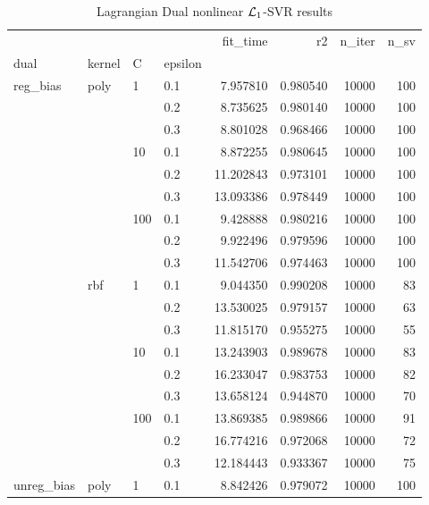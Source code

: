 \begin{table}[H]
\centering
\caption{Lagrangian Dual nonlinear $\protect \mathcal{L}_1$-SVR results}
\label{nonlinear_lagrangian_dual_l1_svr_cv_results}
\begin{tabular}{llllrrrr}
\toprule
           &     &     &     &   fit\_time &        r2 &  n\_iter &  n\_sv \\
dual & kernel & C & epsilon &            &           &         &       \\
\midrule
reg\_bias & poly & 1   & 0.1 &   7.957810 &  0.980540 &   10000 &   100 \\
           &     &     & 0.2 &   8.735625 &  0.980140 &   10000 &   100 \\
           &     &     & 0.3 &   8.801028 &  0.968466 &   10000 &   100 \\
           &     & 10  & 0.1 &   8.872255 &  0.980645 &   10000 &   100 \\
           &     &     & 0.2 &  11.202843 &  0.973101 &   10000 &   100 \\
           &     &     & 0.3 &  13.093386 &  0.978449 &   10000 &   100 \\
           &     & 100 & 0.1 &   9.428888 &  0.980216 &   10000 &   100 \\
           &     &     & 0.2 &   9.922496 &  0.979596 &   10000 &   100 \\
           &     &     & 0.3 &  11.542706 &  0.974463 &   10000 &   100 \\
           & rbf & 1   & 0.1 &   9.044350 &  0.990208 &   10000 &    83 \\
           &     &     & 0.2 &  13.530025 &  0.979157 &   10000 &    63 \\
           &     &     & 0.3 &  11.815170 &  0.955275 &   10000 &    55 \\
           &     & 10  & 0.1 &  13.243903 &  0.989678 &   10000 &    83 \\
           &     &     & 0.2 &  16.233047 &  0.983753 &   10000 &    82 \\
           &     &     & 0.3 &  13.658124 &  0.944870 &   10000 &    70 \\
           &     & 100 & 0.1 &  13.869385 &  0.989866 &   10000 &    91 \\
           &     &     & 0.2 &  16.774216 &  0.972068 &   10000 &    72 \\
           &     &     & 0.3 &  12.184443 &  0.933367 &   10000 &    75 \\
unreg\_bias & poly & 1   & 0.1 &   8.842426 &  0.979072 &   10000 &   100 \\

\end{tabular}
\end{table}
